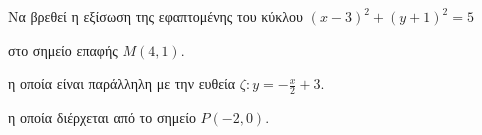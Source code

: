 Να βρεθεί η εξίσωση της εφαπτομένης του κύκλου $ (x-3)^2+(y+1)^2=5 $
\begin{alist}
\item στο σημείο επαφής $ M(4,1) $.
\item η οποία είναι παράλληλη με την ευθεία $ \zeta: y=-\frac{x}{2}+3 $.
\item η οποία διέρχεται από το σημείο $ P(-2,0) $.
\end{alist}
